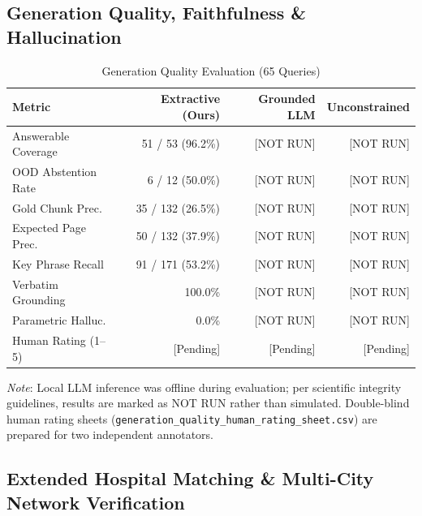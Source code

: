 \documentclass[conference]{IEEEtran}
\begin{document}
\subsection{Generation Quality, Faithfulness \& Hallucination}

\begin{table}[htbp]
\caption{Generation Quality Evaluation (65 Queries)}
\begin{center}
\begin{tabular}{lrrr}
\toprule
\textbf{Metric} & \textbf{Extractive (Ours)} & \textbf{Grounded LLM} & \textbf{Unconstrained} \\
\midrule
Answerable Coverage & 51 / 53 (96.2\%) & [NOT RUN] & [NOT RUN] \\
OOD Abstention Rate & 6 / 12 (50.0\%) & [NOT RUN] & [NOT RUN] \\
Gold Chunk Prec. & 35 / 132 (26.5\%) & [NOT RUN] & [NOT RUN] \\
Expected Page Prec. & 50 / 132 (37.9\%) & [NOT RUN] & [NOT RUN] \\
Key Phrase Recall & 91 / 171 (53.2\%) & [NOT RUN] & [NOT RUN] \\
Verbatim Grounding & 100.0\% & [NOT RUN] & [NOT RUN] \\
Parametric Halluc. & 0.0\% & [NOT RUN] & [NOT RUN] \\
Human Rating (1--5) & [Pending] & [Pending] & [Pending] \\
\bottomrule
\end{tabular}
\end{center}
\end{table}

\textit{Note}: Local LLM inference was offline during evaluation; per scientific integrity guidelines, results are marked as NOT RUN rather than simulated. Double-blind human rating sheets (\texttt{generation\_quality\_human\_rating\_sheet.csv}) are prepared for two independent annotators.

\subsection{Extended Hospital Matching \& Multi-City Network Verification}
\end{document}
